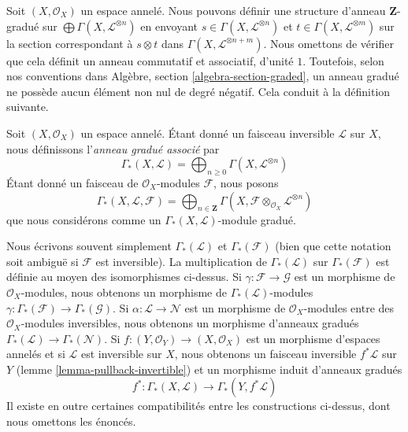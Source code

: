 \medskip\noindent
Soit $(X, \mathcal{O}_X)$ un espace annelé. Nous pouvons définir une structure
d'anneau $\mathbf{Z}$-gradué sur $\bigoplus \Gamma(X, \mathcal{L}^{\otimes n})$ en envoyant
$s \in \Gamma(X, \mathcal{L}^{\otimes n})$ et
$t \in \Gamma(X, \mathcal{L}^{\otimes m})$ sur la
section correspondant à $s \otimes t$ dans
$\Gamma(X, \mathcal{L}^{\otimes n + m})$.
Nous omettons de vérifier que cela définit un anneau commutatif
et associatif, d'unité $1$. Toutefois, selon nos conventions dans
Algèbre, section \ref{algebra-section-graded},
un anneau gradué ne possède aucun élément non nul de degré négatif.
Cela conduit à la définition suivante.

\begin{definition}
\label{definition-gamma-star}
Soit $(X, \mathcal{O}_X)$ un espace annelé.
Étant donné un faisceau inversible $\mathcal{L}$ sur $X$, nous définissons
l'{\it anneau gradué associé} par
$$
\Gamma_*(X, \mathcal{L})
=
\bigoplus\nolimits_{n \geq 0} \Gamma(X, \mathcal{L}^{\otimes n})
$$
Étant donné un faisceau de $\mathcal{O}_X$-modules $\mathcal{F}$, nous posons
$$
\Gamma_*(X, \mathcal{L}, \mathcal{F})
=
\bigoplus\nolimits_{n \in \mathbf{Z}} \Gamma(X,
\mathcal{F} \otimes_{\mathcal{O}_X} \mathcal{L}^{\otimes n})
$$
que nous considérons comme un $\Gamma_*(X, \mathcal{L})$-module gradué.
\end{definition}

\noindent
Nous écrivons souvent simplement $\Gamma_*(\mathcal{L})$ et $\Gamma_*(\mathcal{F})$
(bien que cette notation soit ambiguë si $\mathcal{F}$ est inversible).
La multiplication de $\Gamma_*(\mathcal{L})$ sur
$\Gamma_*(\mathcal{F})$ est définie au moyen des isomorphismes
ci-dessus. Si $\gamma : \mathcal{F} \to \mathcal{G}$ est un morphisme de
$\mathcal{O}_X$-modules, nous obtenons un morphisme de $\Gamma_*(\mathcal{L})$-modules
$\gamma : \Gamma_*(\mathcal{F}) \to \Gamma_*(\mathcal{G})$.
Si $\alpha : \mathcal{L} \to \mathcal{N}$ est un morphisme de
$\mathcal{O}_X$-modules entre des $\mathcal{O}_X$-modules inversibles, nous obtenons
un morphisme d'anneaux gradués $\Gamma_*(\mathcal{L}) \to \Gamma_*(\mathcal{N})$.
Si $f : (Y, \mathcal{O}_Y) \to (X, \mathcal{O}_X)$
est un morphisme d'espaces annelés et si $\mathcal{L}$ est inversible
sur $X$, nous obtenons un faisceau inversible $f^*\mathcal{L}$ sur $Y$
(lemme \ref{lemma-pullback-invertible})
et un morphisme induit d'anneaux gradués
$$
f^* :
\Gamma_*(X, \mathcal{L})
\longrightarrow
\Gamma_*(Y, f^*\mathcal{L})
$$
Il existe en outre certaines compatibilités entre les constructions
ci-dessus, dont nous omettons les énoncés.

